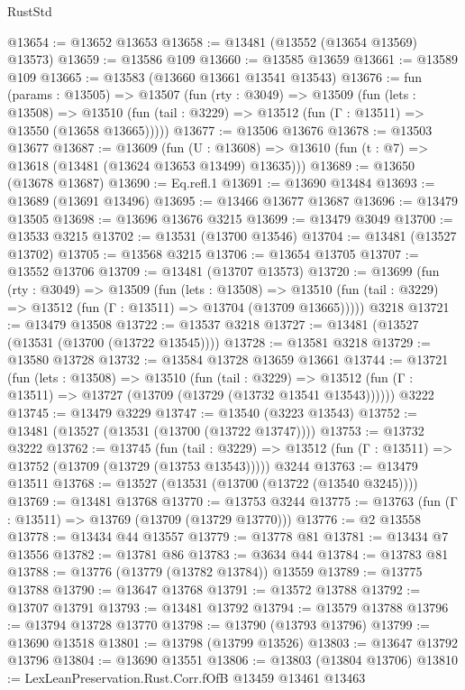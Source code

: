 \begin{lexlean}{RustStd}
\begin{coremodule}
{\begin{coremodule}
{{{{{{{{{{{{{{{{{{{{{{{{{{{{{{{{{{{{{@13654 := @13652 @13653
@13658 := @13481 (@13552 (@13654 @13569) @13573)
@13659 := @13586 @109
@13660 := @13585 @13659
@13661 := @13589 @109
@13665 := @13583 (@13660 @13661 @13541 @13543)
@13676 := fun (params : @13505) =>
  @13507
    (fun (rty : @3049) =>
    @13509
      (fun (lets : @13508) =>
      @13510 (fun (tail : @3229) => @13512 (fun (Γ : @13511) => @13550 (@13658 @13665)))))
@13677 := @13506 @13676
@13678 := @13503 @13677
@13687 := @13609
    (fun (U : @13608) => @13610 (fun (t : @7) => @13618 (@13481 (@13624 @13653 @13499) @13635)))
@13689 := @13650 (@13678 @13687)
@13690 := Eq.refl.{1}
@13691 := @13690 @13484
@13693 := @13689 (@13691 @13496)
@13695 := @13466 @13677 @13687
@13696 := @13479 @13505
@13698 := @13696 @13676 @3215
@13699 := @13479 @3049
@13700 := @13533 @3215
@13702 := @13531 (@13700 @13546)
@13704 := @13481 (@13527 @13702)
@13705 := @13568 @3215
@13706 := @13654 @13705
@13707 := @13552 @13706
@13709 := @13481 (@13707 @13573)
@13720 := @13699
    (fun (rty : @3049) =>
    @13509
      (fun (lets : @13508) =>
      @13510 (fun (tail : @3229) => @13512 (fun (Γ : @13511) => @13704 (@13709 @13665)))))
    @3218
@13721 := @13479 @13508
@13722 := @13537 @3218
@13727 := @13481 (@13527 (@13531 (@13700 (@13722 @13545))))
@13728 := @13581 @3218
@13729 := @13580 @13728
@13732 := @13584 @13728 @13659 @13661
@13744 := @13721
    (fun (lets : @13508) =>
    @13510
      (fun (tail : @3229) =>
      @13512 (fun (Γ : @13511) => @13727 (@13709 (@13729 (@13732 @13541 @13543))))))
    @3222
@13745 := @13479 @3229
@13747 := @13540 (@3223 @13543)
@13752 := @13481 (@13527 (@13531 (@13700 (@13722 @13747))))
@13753 := @13732 @3222
@13762 := @13745
    (fun (tail : @3229) => @13512 (fun (Γ : @13511) => @13752 (@13709 (@13729 (@13753 @13543)))))
    @3244
@13763 := @13479 @13511
@13768 := @13527 (@13531 (@13700 (@13722 (@13540 @3245))))
@13769 := @13481 @13768
@13770 := @13753 @3244
@13775 := @13763 (fun (Γ : @13511) => @13769 (@13709 (@13729 @13770)))
@13776 := @2 @13558
@13778 := @13434 @44 @13557
@13779 := @13778 @81
@13781 := @13434 @7 @13556
@13782 := @13781 @86
@13783 := @3634 @44
@13784 := @13783 @81
@13788 := @13776 (@13779 (@13782 @13784)) @13559
@13789 := @13775 @13788
@13790 := @13647 @13768
@13791 := @13572 @13788
@13792 := @13707 @13791
@13793 := @13481 @13792
@13794 := @13579 @13788
@13796 := @13794 @13728 @13770
@13798 := @13790 (@13793 @13796)
@13799 := @13690 @13518
@13801 := @13798 (@13799 @13526)
@13803 := @13647 @13792 @13796
@13804 := @13690 @13551
@13806 := @13803 (@13804 @13706)
@13810 := LexLeanPreservation.Rust.Corr.fOfB @13459 @13461 @13463
}}}}}}}}}}}}}}}}}}}}}}}}}}}}}}}}}}}}}
\end{coremodule}}
\end{coremodule}
\end{lexlean}
